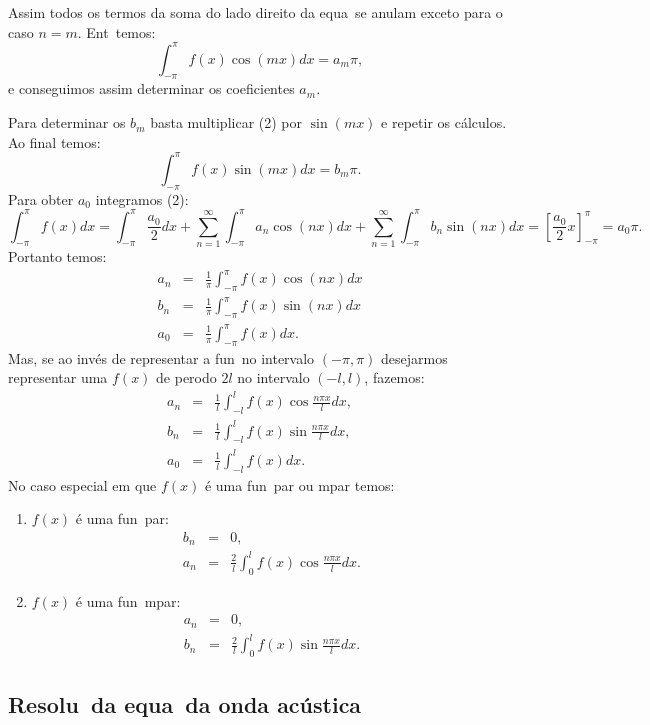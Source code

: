 Assim todos os termos da soma do lado direito da equa\cao\ se
anulam exceto para o caso $n=m$. Ent\ao\ temos:
\[\int_{-\pi}^{\pi} f(x)\cos (mx)dx = a_{m}\pi,\]
e conseguimos assim determinar os coeficientes $a_{m}$.

Para determinar os $b_{m}$ basta multiplicar (2) por $\sin (mx)$ e
repetir os c\'alculos. Ao final temos:
\[
\int_{-\pi}^{\pi} f(x)\sin (mx)dx = b_{m}\pi.
\]
Para obter $a_{0}$ integramos (2):
\[
\int_{-\pi}^{\pi} f(x)dx =
\int_{-\pi}^{\pi} \frac{a_{0}}{2}dx +
   \sum_{n=1}^{\infty}\int_{-\pi}^{\pi} a_{n}\cos (nx)dx +
   \sum_{n=1}^{\infty}\int_{-\pi}^{\pi} b_{n}\sin (nx)dx =
\left[ \frac{a_{0}}{2}x\right]_{-\pi}^{\pi} = a_{0}\pi.
 \]
Portanto temos:
\begin{eqnarray*}
a_{n} &=& \frac{1}{\pi}\int_{-\pi}^{\pi} f(x)\cos (nx)dx \\
b_{n} &=& \frac{1}{\pi}\int_{-\pi}^{\pi} f(x)\sin (nx)dx \\
a_{0} &=& \frac{1}{\pi}\int_{-\pi}^{\pi} f(x)dx.
\end{eqnarray*}
Mas, se ao inv\'es de representar a fun\cao\ no intervalo $(-\pi,\pi)$
desejarmos representar uma $f(x)$ de per\ih odo $2l$ no intervalo $(-l,l)$,
fazemos:
\begin{eqnarray*}
a_{n} &=& \frac{1}{l}\int_{-l}^{l} f(x)\cos \frac{n\pi x}{l}dx, \\
b_{n} &=& \frac{1}{l}\int_{-l}^{l} f(x)\sin \frac{n\pi x}{l}dx, \\
a_{0} &=& \frac{1}{l}\int_{-l}^{l} f(x)dx. 
\end{eqnarray*}
No caso especial em que $f(x)$ \'e uma fun\cao\ par ou \ih mpar temos:
\begin{enumerate}
\item $f(x)$ \'e uma fun\cao\ par:
\begin{eqnarray*}
b_{n} &=& 0, \\
a_{n} &=& \frac{2}{l}\int_{0}^{l} f(x)\cos \frac{n\pi x}{l}dx.
\end{eqnarray*}
\item $f(x)$ \'e uma fun\cao\ \ih mpar:
\begin{eqnarray*}
a_{n} &=& 0, \\
b_{n} &=& \frac{2}{l}\int_{0}^{l} f(x)\sin \frac{n\pi x}{l}dx.
\end{eqnarray*}
\end{enumerate}

\subsection {Resolu\cao\ da equa\cao\ da onda ac\'ustica}

